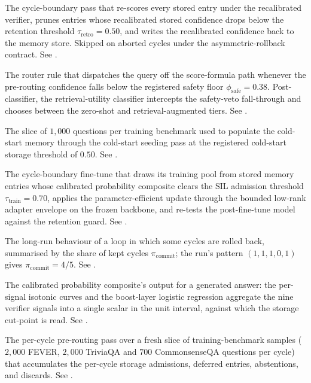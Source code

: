 \begin{description}[style=nextline, leftmargin=0pt, labelindent=0pt, itemsep=6pt, parsep=0pt, font=\bfseries, beginpenalty=10000]
\item[Retroactive re-verification:]\nopagebreak[4] The cycle-boundary pass that re-scores every stored entry under the recalibrated verifier, prunes entries whose recalibrated stored confidence drops below the retention threshold $\tau_{\text{retro}} = 0.50$, and writes the recalibrated confidence back to the memory store. Skipped on aborted cycles under the asymmetric-rollback contract. See .

\item[Safety override:] The router rule that dispatches the query off the score-formula path whenever the pre-routing confidence falls below the registered safety floor $\phi_{\text{safe}} = 0.38$. Post-classifier, the retrieval-utility classifier intercepts the safety-veto fall-through and chooses between the zero-shot and retrieval-augmented tiers. See .

\item[Seed pool:] The slice of $1{,}000$ questions per training benchmark used to populate the cold-start memory through the cold-start seeding pass at the registered cold-start storage threshold of $0.50$. See .

\item[Self-improvement loop:]\nopagebreak[4] The cycle-boundary fine-tune that draws its training pool from stored memory entries whose calibrated probability composite clears the SIL admission threshold $\tau_{\text{train}} = 0.70$, applies the parameter-efficient update through the bounded low-rank adapter envelope on the frozen backbone, and re-tests the post-fine-tune model against the retention guard. See .

\item[Stochastic equilibrium:] The long-run behaviour of a loop in which some cycles are rolled back, summarised by the share of kept cycles $\pi_{\mathrm{commit}}$; the run's pattern $(1, 1, 1, 0, 1)$ gives $\pi_{\mathrm{commit}} = 4/5$. See .

\item[Stored confidence (\boldmath$u_{\text{stored}}$):] The calibrated probability composite's output for a generated answer: the per-signal isotonic curves and the boost-layer logistic regression aggregate the nine verifier signals into a single scalar in the unit interval, against which the storage cut-point is read. See .

\item[Stream chunk:] The per-cycle pre-routing pass over a fresh slice of training-benchmark samples ($2{,}000$ FEVER, $2{,}000$ TriviaQA and $700$ CommonsenseQA questions per cycle) that accumulates the per-cycle storage admissions, deferred entries, abstentions, and discards. See .


\end{description}
